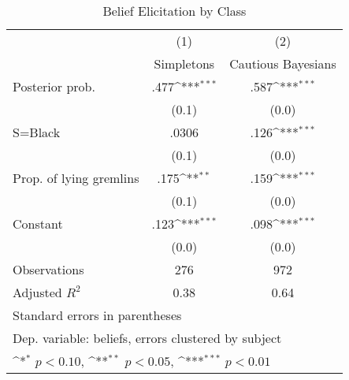 \begin{table}[htbp]\centering
\def\sym#1{\ifmmode^{#1}\else\(^{#1}\)\fi}
\caption{Belief Elicitation by Class}
\begin{tabular}{l*{2}{c}}
\hline\hline
                &\multicolumn{1}{c}{(1)}&\multicolumn{1}{c}{(2)}\\
                &\multicolumn{1}{c}{Simpletons}&\multicolumn{1}{c}{Cautious Bayesians}\\
\hline
Posterior prob. &     .477\sym{***}&     .587\sym{***}\\
                &    (0.1)         &    (0.0)         \\
S=Black         &    .0306         &     .126\sym{***}\\
                &    (0.1)         &    (0.0)         \\
Prop. of lying gremlins&     .175\sym{**} &     .159\sym{***}\\
                &    (0.1)         &    (0.0)         \\
Constant        &     .123\sym{***}&     .098\sym{***}\\
                &    (0.0)         &    (0.0)         \\
\hline
Observations    &      276         &      972         \\
Adjusted \(R^{2}\)&     0.38         &     0.64         \\
\hline\hline
\multicolumn{3}{l}{\footnotesize Standard errors in parentheses}\\
\multicolumn{3}{l}{\footnotesize Dep. variable: beliefs, errors clustered by subject}\\
\multicolumn{3}{l}{\footnotesize \sym{*} \(p<0.10\), \sym{**} \(p<0.05\), \sym{***} \(p<0.01\)}\\
\end{tabular}
\end{table}
